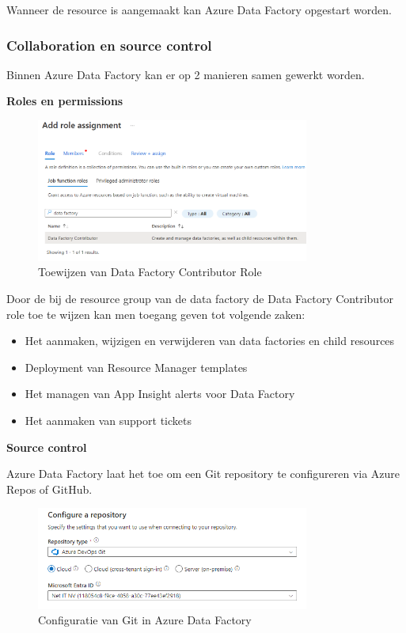 Wanneer de resource is aangemaakt kan Azure Data Factory opgestart worden.

\subsubsection{Collaboration en source control}

Binnen Azure Data Factory kan er op 2 manieren samen gewerkt worden. 

\textbf{Roles en permissions}

\begin{figure}[H]
    \centering
    \includegraphics[width=0.8\textwidth]{./graphics/adf/adf_contributor.png}
    \caption{Toewijzen van Data Factory Contributor Role}
\end{figure}

Door de bij de resource group van de data factory de Data Factory Contributor role toe te wijzen kan men toegang geven tot volgende zaken:
\begin{itemize}
    \item Het aanmaken, wijzigen en verwijderen van data factories en child resources
    \item Deployment van Resource Manager templates
    \item Het managen van App Insight alerts voor Data Factory
    \item Het aanmaken van support tickets
\end{itemize}

\textbf{Source control}

Azure Data Factory laat het toe om een Git repository te configureren via Azure Repos of GitHub. 

\begin{figure}[H]
    \centering
    \includegraphics[width=0.8\textwidth]{./graphics/adf/setup_repository_2_specific.png}
    \caption{Configuratie van Git in Azure Data Factory}
\end{figure}

